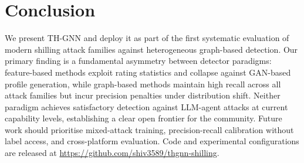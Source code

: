 
\section{Conclusion}
\label{sec:conclusion}

We present TH-GNN and deploy it as part of the first systematic evaluation of modern shilling attack families against heterogeneous graph-based detection. Our primary finding is a fundamental asymmetry between detector paradigms: feature-based methods exploit rating statistics and collapse against GAN-based profile generation, while graph-based methods maintain high recall across all attack families but incur precision penalties under distribution shift. Neither paradigm achieves satisfactory detection against LLM-agent attacks at current capability levels, establishing a clear open frontier for the community. Future work should prioritise mixed-attack training, precision-recall calibration without label access, and cross-platform evaluation. Code and experimental configurations are released at \url{https://github.com/shiv3589/thgnn-shilling}.
